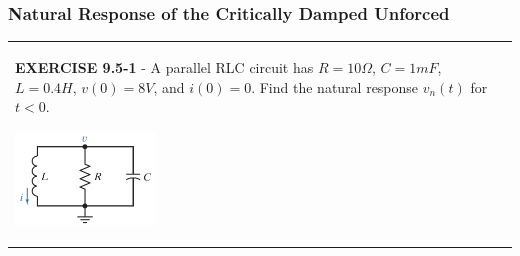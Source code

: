 \documentclass[aspectratio=169]{beamer}
\begin{document}
\begin{frame}[fragile]
	\frametitle{Natural Response of the Critically Damped Unforced}
\begin{tabular}{ll}
	\begin{columns}
		\begin{column}{1\textwidth}  %
		\textbf{EXERCISE 9.5-1} - A parallel RLC circuit has $R=10 \Omega$, $C = 1 mF$, $L = 0.4 H$, $v(0) = 8 V$, and
$i(0) = 0$. Find the natural response $v_n (t)$ for $t < 0$.
		\begin{center}
    			\includegraphics[height=2.5cm]{figure9.png}	
		\end{center}	
		\scalebox{0.8}{Answer: $v_n(t)=(8-400t)e^{-50t}V$ }
		\end{column}
	\end{columns}
\end{tabular}
\end{frame}



\end{document}
